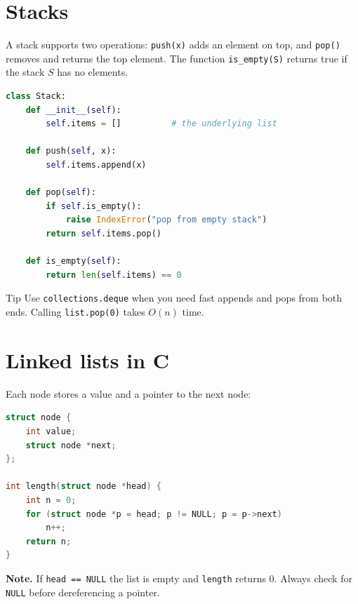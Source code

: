 \documentclass[11pt]{article}
\begin{document}
\section{Stacks}
A stack supports two operations: \texttt{push(x)} adds an element on top, and \texttt{pop()} removes and returns the top element. The function \texttt{is\_empty(S)} returns true if the stack $S$ has no elements.
\begin{lstlisting}[language=Python]
class Stack:
    def __init__(self):
        self.items = []          # the underlying list

    def push(self, x):
        self.items.append(x)

    def pop(self):
        if self.is_empty():
            raise IndexError("pop from empty stack")
        return self.items.pop()

    def is_empty(self):
        return len(self.items) == 0
\end{lstlisting}
\begin{tipbox}{Tip}
Use \texttt{collections.deque} when you need fast appends and pops from both ends. Calling \texttt{list.pop(0)} takes $O(n)$ time.
\end{tipbox}
\section{Linked lists in C}
Each node stores a value and a pointer to the next node:
\begin{lstlisting}[language=C]
struct node {
    int value;
    struct node *next;
};

int length(struct node *head) {
    int n = 0;
    for (struct node *p = head; p != NULL; p = p->next)
        n++;
    return n;
}
\end{lstlisting}
\begin{notebox}
\textbf{Note.} If \texttt{head == NULL} the list is empty and \texttt{length} returns 0. Always check for \texttt{NULL} before dereferencing a pointer.
\end{notebox}
\end{document}
